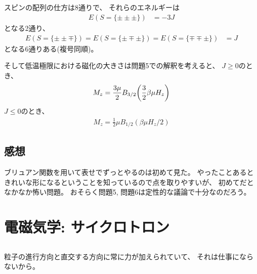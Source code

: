 \documentclass[../../master.tex]{subfiles}
\begin{document}
\subsection{}
スピンの配列の仕方は8通りで、
それらのエネルギーは
\begin{align}
    E(S=\{\pm\pm\pm\}) &= -3J
\end{align}
となる2通り、
\begin{align}
    E(S=\{\pm\pm\mp\}) = E(S=\{\pm\mp\pm\}) = E(S=\{\mp\mp\pm\}) &= J
\end{align}
となる6通りある(複号同順)。

そして低温極限における磁化の大きさは問題5での解釈を考えると、
\(J\ge 0\)のとき、
\begin{align}
    M_z = \frac{3\mu}{2}B_{3/2}\qty(\frac{3}{2}\beta\mu H_z)
\end{align}
\(J\le0\)のとき、
\begin{align}
    M_z = \frac{1}{2}\mu B_{1/2}(\beta\mu H_z/2)
\end{align}


\subsection*{感想}
ブリュアン関数を用いて表せでずっとやるのは初めて見た。
やったことあるときれいな形になるということを知っているので点を取りやすいが、
初めてだとなかなか怖い問題。
おそらく問題5, 問題6は定性的な議論で十分なのだろう。

\clearpage
\section{電磁気学: サイクロトロン}
\subsection{}
粒子の進行方向と直交する方向に常に力が加えられていて、
それは仕事にならないから。
\end{document}
